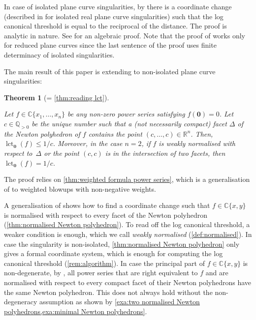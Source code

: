 \documentclass[a4paper, 12pt, oneside]{article}
\theoremstyle{plain}
\newtheorem*{theorem*}{Theorem}
\theoremstyle{definition}
\theoremstyle{remark}
\numberwithin{theorem}{section}
\numberwithin{table}{section}
\numberwithin{equation}{theorem}
\begin{document}
In case of isolated plane curve singularities, by \cite[Theorem~4.4]{Var82} there is a coordinate change (described in \cite{Var77} for isolated real plane curve singularities) such that the log canonical threshold is equal to the reciprocal of the distance. The proof is analytic in nature. See \cite[Theorem~6.40]{KSC04} for an algebraic proof. Note that the proof of \cite[Theorem~6.40]{KSC04} works only for reduced plane curves since the last sentence of the proof uses finite determinacy of isolated singularities.

The main result of this paper is extending \cite[Theorem~4.4]{Var82} to non-isolated plane curve singularities:

\newcommand\MainTheorem{
  Let $f \in \mathbb C\{x_1, \ldots, x_n\}$ be any non-zero power series satisfying $f(\bm 0) = 0$. Let $c \in \mathbb Q_{>0}$ be the unique number such that a (not necessarily compact) facet $\Delta$ of the Newton polyhedron of $f$ contains the point $(c, \ldots, c) \in \mathbb R^n$. Then, $\operatorname{lct}_{\bm 0}(f) \leq 1/c$. Moreover, in the case $n = 2$, if $f$ is weakly normalised with respect to~$\Delta$ or the point $(c, c)$ is in the intersection of two facets, then $\operatorname{lct}_{\bm 0}(f) = 1/c$.
}
\begin{theorem*}[= {\cref{thm:reading lct}}] \label{thm:main}
\MainTheorem{}
\end{theorem*}

The proof relies on \cref{thm:weighted formula power series}, which is a generalisation of \cite[Proposition~8.14]{Kol97} to weighted blowups with non-negative weights.

A generalisation of \cite[Algorithm~4]{BMP20} shows how to find a coordinate change such that $f \in \mathbb C\{x, y\}$ is normalised with respect to every facet of the Newton polyhedron (\cref{thm:normalised Newton polyhedron}). To read off the log canonical threshold, a weaker condition is enough, which we call \emph{weakly normalised} (\cref{def:normalised}). In case the singularity is non-isolated, \cref{thm:normalised Newton polyhedron} only gives a formal coordinate system, which is enough for computing the log canonical threshold (\cref{rem:algorithm}). In case the principal part of $f \in \mathbb C\{x, y\}$ is non-degenerate, by \cite[Remark~3.28]{BMP20}, all power series that are right equivalent to $f$ and are normalised with respect to every compact facet of their Newton polyhedrons have the same Newton polyhedron. This does not always hold without the non-degeneracy assumption as shown by \cref{exa:two normalised Newton polyhedrons,exa:minimal Newton polyhedrons}.
\end{document}
